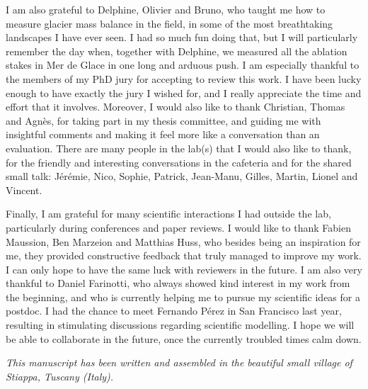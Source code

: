 I am also grateful to Delphine, Olivier and Bruno, who taught me how to measure glacier mass balance in the field, in some of the most breathtaking landscapes I have ever seen. I had so much fun doing that, but I will particularly remember the day when, together with Delphine, we measured all the ablation stakes in Mer de Glace in one long and arduous push. I am especially thankful to the members of my PhD jury for accepting to review this work. I have been lucky enough to have exactly the jury I wished for, and I really appreciate the time and effort that it involves. Moreover, I would also like to thank Christian, Thomas and Agnès, for taking part in my thesis committee, and guiding me with insightful comments  and making it feel more like a conversation than an evaluation. There are many people in the lab(s) that I would also like to thank, for the friendly and interesting conversations in the cafeteria and for the shared small talk: Jérémie, Nico, Sophie, Patrick, Jean-Manu, Gilles, Martin, Lionel and Vincent. 

Finally, I am grateful for many scientific interactions I had outside the lab, particularly during conferences and paper reviews. I would like to thank Fabien Maussion, Ben Marzeion and Matthias Huss, who besides being an inspiration for me, they provided constructive feedback that truly managed to improve my work. I can only hope to have the same luck with reviewers in the future. I am also very thankful to Daniel Farinotti, who always showed kind interest in my work from the beginning, and who is currently helping me to pursue my scientific ideas for a postdoc. I had the chance to meet Fernando Pérez in San Francisco last year, resulting in stimulating discussions regarding scientific modelling. I hope we will be able to collaborate in the future, once the currently troubled times calm down.

\bigskip
\bigskip
\bigskip
\bigskip

\begin{flushright}
\begin{small}
\textit{This manuscript has been written and assembled in the beautiful small village of Stiappa, Tuscany (Italy).}
\end{small}
\end{flushright}
